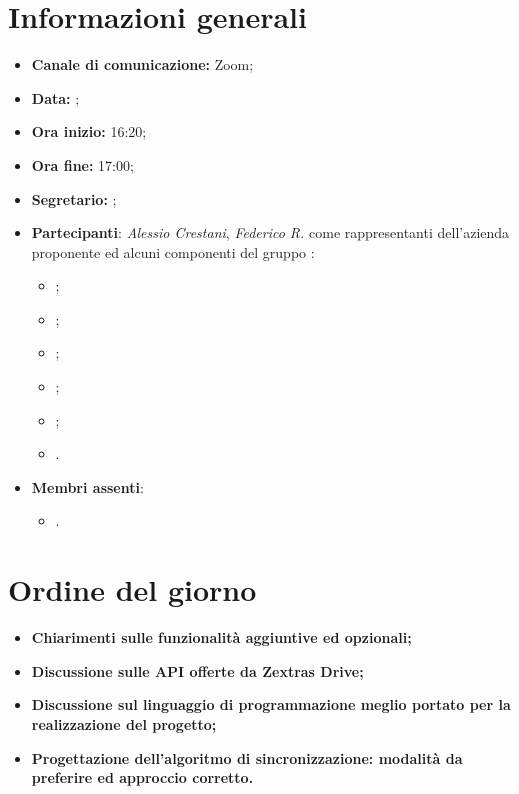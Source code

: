 \section{Informazioni generali}

\begin{itemize}

	\item \textbf{Canale di comunicazione:} Zoom;
	
	\item \textbf{Data:} \DataMeeting{};
	
	\item \textbf{Ora inizio:} 16:20;
	
	\item \textbf{Ora fine:} 17:00;
	
	\item \textbf{Segretario:} \Lucrezia{};
	
	\item \textbf{Partecipanti}: \textit{Alessio Crestani}, \textit{Federico R.} come rappresentanti dell'azienda proponente \proponente{} ed alcuni componenti del gruppo \Gruppo{}:
	
		\begin{itemize}
			\item \Daniele{};
			\item \Davide{};
			\item \Francesco{};
			\item \Giosue{};
			\item \Lucrezia{};
			\item \Matteo{}.
		\end{itemize}



	\item \textbf{Membri assenti}:
		\begin{itemize}
			\item \Tommaso{}.
		\end{itemize}
	\end{itemize}
\section{Ordine del giorno}

\begin{itemize}
	\item\textbf{Chiarimenti sulle funzionalità aggiuntive ed opzionali;}
	\item\textbf{Discussione sulle API offerte da Zextras Drive;}
	\item\textbf{Discussione sul linguaggio di programmazione meglio portato per la realizzazione del progetto;}
	\item\textbf{Progettazione dell'algoritmo di sincronizzazione: modalità da preferire ed approccio corretto.}


\end{itemize}

